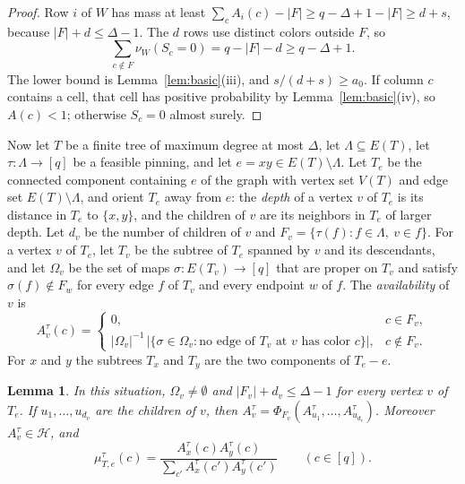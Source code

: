 \documentclass{amsart}
\numberwithin{equation}{section}
\theoremstyle{plain}
\newtheorem{lemma}[theorem]{Lemma}
\theoremstyle{definition}
\theoremstyle{remark}
\newcommand{\cH}{\mathcal{H}}
\begin{document}
\begin{proof}
Row $i$ of $W$ has mass at least $\sum_cA_i(c)-|F|\ge q-\Delta+1-|F|\ge d+s$, because $|F|+d\le\Delta-1$. The $d$ rows use distinct colors outside $F$, so
\[
\sum_{c\notin F}\nu_W(S_c=0)=q-|F|-d\ge q-\Delta+1 .
\] The lower bound is Lemma~\ref{lem:basic}(iii), and $s/(d+s)\ge a_0$. If column $c$ contains a cell, that cell has positive probability by Lemma~\ref{lem:basic}(iv), so $A(c)<1$; otherwise $S_c=0$ almost surely.
\end{proof}

Now let $T$ be a finite tree of maximum degree at most $\Delta$, let $\Lambda\subseteq E(T)$, let $\tau\colon\Lambda\to[q]$ be a feasible pinning, and let $e=xy\in E(T)\setminus\Lambda$. Let $T_e$ be the connected component containing $e$ of the graph with vertex set $V(T)$ and edge set $E(T)\setminus\Lambda$, and orient $T_e$ away from $e$: the \emph{depth} of a vertex $v$ of $T_e$ is its distance in $T_e$ to $\{x,y\}$, and the children of $v$ are its neighbors in $T_e$ of larger depth. Let $d_v$ be the number of children of $v$ and $F_v=\{\tau(f):f\in\Lambda,\ v\in f\}$. For a vertex $v$ of $T_e$, let $T_v$ be the subtree of $T_e$ spanned by $v$ and its descendants, and let $\Omega_v$ be the set of maps $\sigma\colon E(T_v)\to[q]$ that are proper on $T_v$ and satisfy $\sigma(f)\notin F_w$ for every edge $f$ of $T_v$ and every endpoint $w$ of $f$. The \emph{availability} of $v$ is
\[
A_v^\tau(c)=\begin{cases}0,&c\in F_v,\\ |\Omega_v|^{-1}\,\bigl|\{\sigma\in\Omega_v:\text{no edge of }T_v\text{ at }v\text{ has color }c\}\bigr|,&c\notin F_v.\end{cases}
\]
For $x$ and $y$ the subtrees $T_x$ and $T_y$ are the two components of $T_e-e$.

\begin{lemma}\label{lem:tree}
In this situation, $\Omega_v\ne\emptyset$ and $|F_v|+d_v\le\Delta-1$ for every vertex $v$ of $T_e$. If $u_1,\dots,u_{d_v}$ are the children of $v$, then $A_v^\tau=\Phi_{F_v}(A_{u_1}^\tau,\dots,A_{u_{d_v}}^\tau)$. Moreover $A_v^\tau\in\cH$, and
\[
\mu_{T,e}^\tau(c)=\frac{A_x^\tau(c)A_y^\tau(c)}{\sum_{c'}A_x^\tau(c')A_y^\tau(c')}\qquad(c\in[q]).
\]
\end{lemma}
\end{document}
